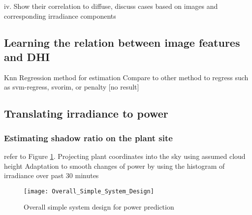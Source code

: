 iv.	Show their correlation to diffuse, discuss cases based on images and corresponding irradiance components


\subsection{Learning the relation between image features and DHI}
Knn Regression method for estimation
Compare to other method to regress such as svm-regress, svorim, or penalty [no result]



\subsection{Translating irradiance to power}
\subsubsection{Estimating shadow ratio on the plant site}
refer to Figure \ref{fig:overall_system_design_power}.
Projecting plant coordinates into the sky using assumed cloud height
Adaptation to smooth changes of power by using the histogram of irradiance over past 30 minutes
\begin{figure}[h]
\caption{Overall simple system design for power prediction}
\label{fig:overall_system_design_power}
\texttt{[image: Overall\_Simple\_System\_Design]}
\centering
\end{figure}
